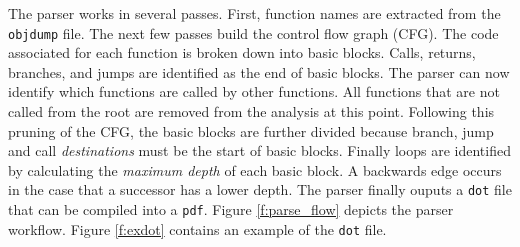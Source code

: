 \documentclass[table,11pt]{article}
\begin{document}
The parser works in several passes. First, function names are extracted from the \texttt{objdump} file. The next few passes build the control flow graph (CFG). The code associated for each function is broken down into basic blocks. Calls, returns, branches, and jumps are identified as the end of basic blocks. The parser can now identify which functions are called by other functions. All functions that are not called from the root are removed from the analysis at this point. Following this pruning of the CFG, the basic blocks are further divided because branch, jump and call \emph{destinations} must be the start of basic blocks. Finally loops are identified by calculating the \emph{maximum depth} of each basic block. A backwards edge occurs in the case that a successor has a lower depth. The parser finally ouputs a \texttt{dot} file that can be compiled into a \texttt{pdf}. Figure \ref{f:parse_flow} depicts the parser workflow. Figure \ref{f:exdot} contains an example of the \texttt{dot} file.
 
\end{document}
